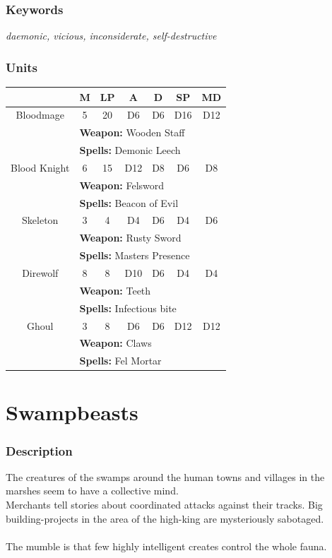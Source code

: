 \documentclass[a5paper,pagesize,10pt,bibtotoc,pointlessnumbers,
normalheadings,DIV=9,twoside=false]{scrbook}
\begin{document}
\subsubsection{Keywords}
\emph{daemonic, vicious, inconsiderate, self-destructive}

\subsubsection{Units}
 \begin{tabular}{||c c c c c c c||} 
 \hline
  & M & LP & A & D & SP & MD \\
 \hline\hline
 Bloodmage & 5 & 20 & D6 & D6 & D16 & D12 \\ 
  & \multicolumn{6}{l||}{\textbf{Weapon:} Wooden Staff} \\
  & \multicolumn{6}{l||}{\textbf{Spells:} Demonic Leech} \\
 \hline
 Blood Knight & 6 & 15 & D12 & D8 & D6 & D8 \\
  & \multicolumn{6}{l||}{\textbf{Weapon:} Felsword} \\
  & \multicolumn{6}{l||}{\textbf{Spells:} Beacon of Evil} \\
 \hline
 Skeleton & 3 & 4 & D4 & D6 & D4 & D6 \\
  & \multicolumn{6}{l||}{\textbf{Weapon:} Rusty Sword} \\
  & \multicolumn{6}{l||}{\textbf{Spells:} Masters Presence} \\
\hline
 Direwolf & 8 & 8 & D10 & D6 & D4 & D4 \\
  & \multicolumn{6}{l||}{\textbf{Weapon:} Teeth} \\
  & \multicolumn{6}{l||}{\textbf{Spells:} Infectious bite} \\
\hline
Ghoul & 3 & 8 & D6 & D6 & D12 & D12 \\
  & \multicolumn{6}{l||}{\textbf{Weapon:} Claws} \\
  & \multicolumn{6}{l||}{\textbf{Spells:} Fel Mortar} \\
\hline
\end{tabular}

\newpage
\section{Swampbeasts}

\subsubsection{Description}
The creatures of the swamps around the human towns and villages in the marshes seem to have a collective mind.\\
Merchants tell stories about coordinated attacks against their tracks. Big building-projects in the area of the high-king are mysteriously sabotaged.\\
\\
The mumble is that few highly intelligent creates control the whole fauna.
\end{document}
